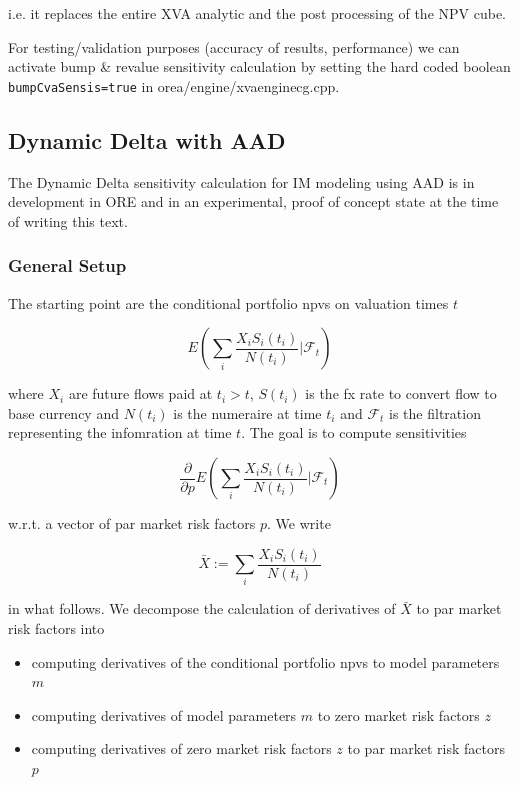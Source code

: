 i.e. it replaces the entire XVA analytic and the post processing of the NPV cube.

For testing/validation purposes (accuracy of results, performance) we can activate bump \& revalue sensitivity
calculation by setting the hard coded boolean {\tt bumpCvaSensis=true} in orea/engine/xvaenginecg.cpp.

\subsection{Dynamic Delta with AAD}

The Dynamic Delta sensitivity calculation for IM modeling using AAD is in development in ORE and in an experimental,
proof of concept state at the time of writing this text.

\subsubsection{General Setup}

The starting point are the conditional portfolio npvs on valuation times $t$

$$
E\left( \sum_i \frac{X_i S_i(t_i)}{N(t_i)} \bigg| \mathcal{F}_t \right)
$$

where $X_i$ are future flows paid at $t_i > t$, $S(t_i)$ is the fx rate to convert flow to base currency and $N(t_i)$ is
the numeraire at time $t_i$ and $\mathcal{F}_t$ is the filtration representing the infomration at time $t$. The goal is
to compute sensitivities

$$
\frac{\partial}{\partial p}E\left( \sum_i \frac{X_i S_i(t_i)}{N(t_i)} \bigg| \mathcal{F}_t \right)
$$

w.r.t. a vector of par market risk factors $p$. We write

$$
\bar{X} := \sum_i \frac{X_i S_i(t_i)}{N(t_i)}
$$

in what follows. We decompose the calculation of derivatives of $\bar{X}$ to par market risk factors into

\begin{itemize}
\item computing derivatives of the conditional portfolio npvs to model parameters $m$
\item computing derivatives of model parameters $m$ to zero market risk factors $z$
\item computing derivatives of zero market risk factors $z$ to par market risk factors $p$
\end{itemize}

